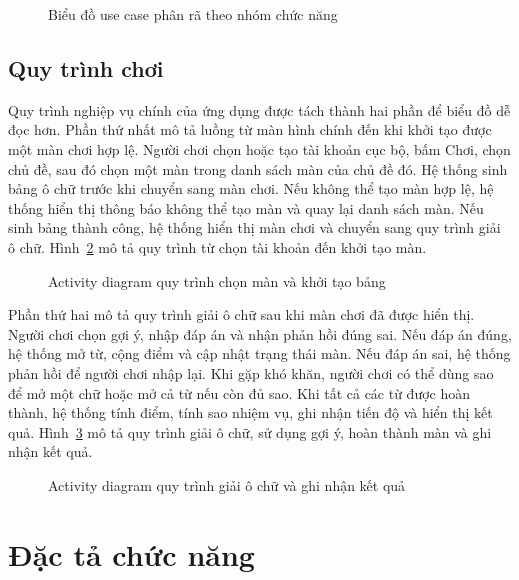﻿\documentclass[../DoAn.tex]{subfiles}
\begin{document}
\begin{figure}[H]
\centering
\resizebox{0.95\textwidth}{!}{}
\caption{Biểu đồ use case phân rã theo nhóm chức năng}
\label{fig:usecase-phan-ra}
\end{figure}

\subsection{Quy trình chơi}
\label{subsection:2.2.3}
Quy trình nghiệp vụ chính của ứng dụng được tách thành hai phần để biểu đồ dễ đọc hơn. Phần thứ nhất mô tả luồng từ màn hình chính đến khi khởi tạo được một màn chơi hợp lệ. Người chơi chọn hoặc tạo tài khoản cục bộ, bấm Chơi, chọn chủ đề, sau đó chọn một màn trong danh sách màn của chủ đề đó. Hệ thống sinh bảng ô chữ trước khi chuyển sang màn chơi. Nếu không thể tạo màn hợp lệ, hệ thống hiển thị thông báo không thể tạo màn và quay lại danh sách màn. Nếu sinh bảng thành công, hệ thống hiển thị màn chơi và chuyển sang quy trình giải ô chữ. Hình~\ref{fig:activity-chon-man} mô tả quy trình từ chọn tài khoản đến khởi tạo màn.

\begin{figure}[H]
\centering
\resizebox{0.82\textwidth}{!}{}
\caption{Activity diagram quy trình chọn màn và khởi tạo bảng}
\label{fig:activity-chon-man}
\end{figure}

Phần thứ hai mô tả quy trình giải ô chữ sau khi màn chơi đã được hiển thị. Người chơi chọn gợi ý, nhập đáp án và nhận phản hồi đúng sai. Nếu đáp án đúng, hệ thống mở từ, cộng điểm và cập nhật trạng thái màn. Nếu đáp án sai, hệ thống phản hồi để người chơi nhập lại. Khi gặp khó khăn, người chơi có thể dùng sao để mở một chữ hoặc mở cả từ nếu còn đủ sao. Khi tất cả các từ được hoàn thành, hệ thống tính điểm, tính sao nhiệm vụ, ghi nhận tiến độ và hiển thị kết quả. Hình~\ref{fig:activity-giai-o-chu} mô tả quy trình giải ô chữ, sử dụng gợi ý, hoàn thành màn và ghi nhận kết quả.

\begin{figure}[p]
\centering
\resizebox{!}{0.82\textheight}{}
\caption{Activity diagram quy trình giải ô chữ và ghi nhận kết quả}
\label{fig:activity-giai-o-chu}
\end{figure}

\section{Đặc tả chức năng}
\label{section:2.3}
\end{document}
